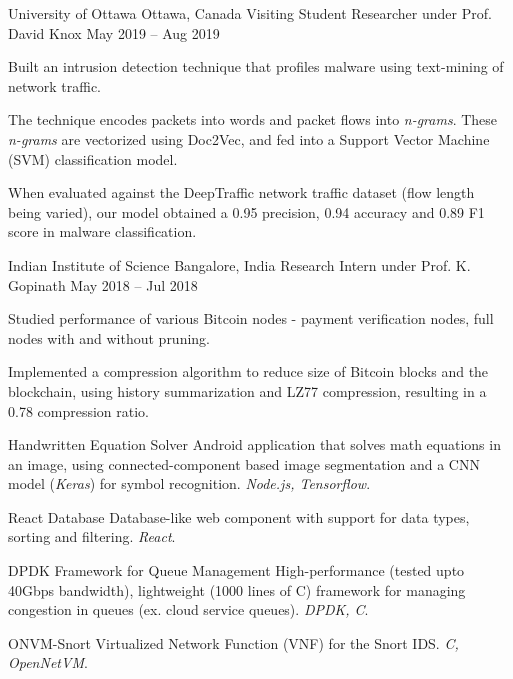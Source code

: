 \documentclass[10pt,letterpaper]{article}
\begin{document}
\headedsection
{University of Ottawa}
{Ottawa, Canada}
{Visiting Student Researcher under Prof. David Knox}
{May 2019 -- Aug 2019}{
	\begin{circlist}
		\item Built an intrusion detection technique that profiles malware using text-mining of network traffic.
		\item The technique encodes packets into words and packet flows into \textit{n-grams}. These \textit{n-grams} are vectorized using Doc2Vec, and fed into a Support Vector Machine (SVM) classification model.
		\item When evaluated against the DeepTraffic network traffic dataset (flow length being varied), our model obtained a 0.95 precision, 0.94 accuracy and 0.89 F1 score in malware classification.
	\end{circlist}
}

\headedsection
{Indian Institute of Science}
{Bangalore, India}
{Research Intern under Prof. K. Gopinath}
{May 2018 -- Jul 2018}{
	\begin{circlist}
		\item Studied performance of various Bitcoin nodes - payment verification nodes, full nodes with and without pruning.
		\item Implemented a compression algorithm to reduce size of Bitcoin blocks and the blockchain, using history summarization and LZ77 compression, resulting in a 0.78 compression ratio.
	\end{circlist}
}


\headedsectiontwo
{Handwritten Equation Solver}{}{}
{
	Android application that solves math equations in an image, using connected-component based image segmentation and a CNN model (\textit{Keras}) for symbol recognition. \textit{Node.js, Tensorflow}.
}

\headedsectiontwo
{React Database}{}{}
{
	Database-like web component with support for data types, sorting and filtering. \textit{React}.
}

\headedsectiontwo
{DPDK Framework for Queue Management}{}{}
{
	High-performance (tested upto 40Gbps bandwidth), lightweight (1000 lines of C) framework for managing congestion in queues (ex. cloud service queues). \textit{DPDK, C}.
}

\headedsectiontwo
{ONVM-Snort}{}{}
{
	Virtualized Network Function (VNF) for the Snort IDS. \textit{C, OpenNetVM}.
}
\end{document}
